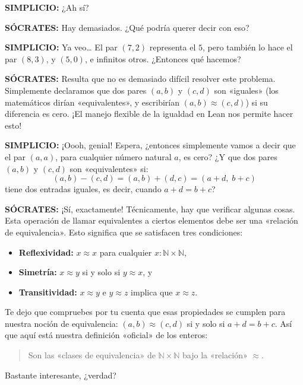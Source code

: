 \medskip
\noindent\textbf{SIMPLICIO:} ¿Ah sí?

\medskip
\noindent\textbf{SÓCRATES:} Hay demasiados. ¿Qué podría querer decir con eso?

\medskip
\noindent\textbf{SIMPLICIO:} Ya veo\ldots{} El par $(7, 2)$ representa el $5$, pero también lo hace el par $(8, 3)$, y $(5, 0)$, e infinitos otros. ¿Entonces qué hacemos?

\medskip
\noindent\textbf{SÓCRATES:} Resulta que no es demasiado difícil resolver este problema. Simplemente declaramos que dos pares $(a, b)$ y $(c, d)$ son «iguales» (los matemáticos dirían «equivalentes», y escribirían $(a, b) \approx (c, d)$) si su diferencia es cero. ¡El manejo flexible de la igualdad en Lean nos permite hacer esto!

\medskip
\noindent\textbf{SIMPLICIO:} ¡Oooh, genial! Espera, ¿entonces simplemente vamos a decir que el par $(a, a)$, para cualquier número natural $a$, es cero? ¿Y que dos pares $(a, b)$ y $(c, d)$ son «equivalentes» si:
\[
  (a, b) - (c, d) = (a, b) + (d, c) = (a+d,\; b+c)
\]
tiene dos entradas iguales, es decir, cuando $a + d = b + c$?

\medskip
\noindent\textbf{SÓCRATES:} ¡Sí, exactamente! Técnicamente, hay que verificar algunas cosas. Esta operación de llamar equivalentes a ciertos elementos debe ser una «relación de equivalencia». Esto significa que se satisfacen tres condiciones:

\begin{itemize}
  \item \textbf{Reflexividad:} $x \approx x$ para cualquier $x : \mathbb{N} \times \mathbb{N}$,
  \item \textbf{Simetría:} $x \approx y$ si y solo si $y \approx x$, y
  \item \textbf{Transitividad:} $x \approx y$ e $y \approx z$ implica que $x \approx z$.
\end{itemize}

Te dejo que compruebes por tu cuenta que esas propiedades se cumplen para nuestra noción de equivalencia: $(a, b) \approx (c, d)$ si y solo si $a + d = b + c$. Así que aquí está nuestra definición «oficial» de los enteros:

\begin{quote}
  Son las «clases de equivalencia» de $\mathbb{N} \times \mathbb{N}$ bajo la «relación» $\approx$.
\end{quote}

Bastante interesante, ¿verdad?

